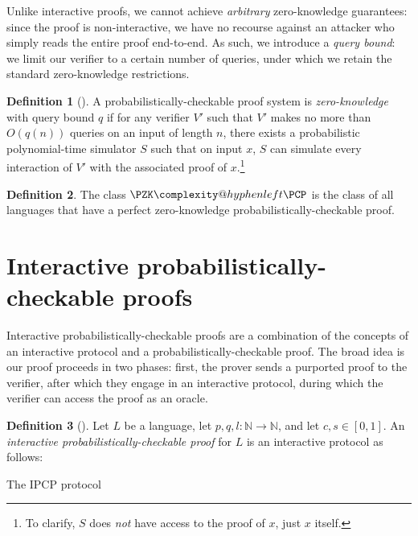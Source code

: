 \documentclass[english]{reedthesis}
\makeatletter
\theoremstyle{plain}
\theoremstyle{definition}
\newtheorem{defn}[defn]{Definition}
\theoremstyle{remark}
\newcommand{\PZKPCP}{%
  \PZK\complexity@hyphenleft\PCP
}
\makeatother
\begin{document}
Unlike interactive proofs, we cannot achieve \emph{arbitrary} zero-knowledge
guarantees: since the proof is non-interactive, we have no recourse against an
attacker who simply reads the entire proof end-to-end. As such, we introduce a
\emph{query bound}: we limit our verifier to a certain number
of queries, under which we retain the standard zero-knowledge restrictions.

\begin{defn}[{\cite[Def.\ 8.6]{GOS24}}]\label{def:pzkpcp}
  A probabilistically-checkable proof system is \emph{zero-knowledge} with query
  bound $q$ if for any verifier $V'$ such that $V'$ makes no more than $O(q(n))$
  queries on an input of length $n$, there exists a probabilistic
  polynomial-time simulator $S$ such that on input $x$, $S$ can simulate every
  interaction of $V'$ with the associated proof of $x$.\footnote{To clarify, $S$
    does \emph{not} have access to the proof of $x$, just $x$ itself.}
\end{defn}


\begin{defn}\label{def:pzkpcp-class}\index{PZK-PCP@$\PZKPCP$}
  The class $\PZKPCP$ is the class of all languages that have a perfect
  zero-knowledge probabilistically-checkable proof.
\end{defn}


\section{Interactive probabilistically-checkable proofs}\label{sec:ipcp}

Interactive probabilistically-checkable proofs are a combination of the concepts
of an interactive protocol and a probabilistically-checkable proof. The broad
idea is our proof proceeds in two phases: first, the prover sends a purported
proof to the verifier, after which they engage in an interactive protocol,
during which the verifier can access the proof as an oracle.

\begin{defn}[{\cite[]{KR08}}]\label{def:ipcp}
  Let $L$ be a language, let $p, q, l: \mathbb{N} \rightarrow \mathbb{N}$, and let $c, s \in [0, 1]$. An
  \emph{interactive probabilistically-checkable proof} for $L$ is an interactive
  protocol as follows:

  \begin{algorithm}[htbp]
    \caption{The IPCP protocol}\label{alg:ipcp-protocol}
  \end{algorithm}
\end{defn}
\end{document}
